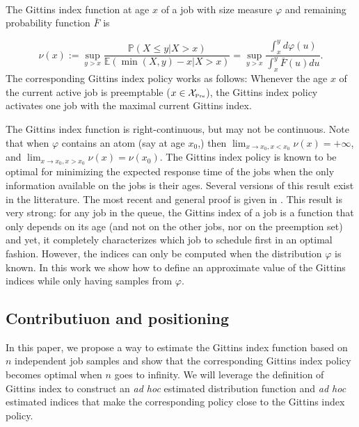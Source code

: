 \documentclass[11pt]{article}
\renewcommand{\phi}{\varphi}
\renewcommand{\leq}{\leqslant}
\newcommand{\E}{\mathbb{E}}
\newcommand{\pr}{\mathbb{P}}
\newcommand{\XP}{\mathcal{X}_{\mbox{\tiny Pre}}}
\begin{document}
\begin{definition}\ \\
   The Gittins index function at age $x$ of a job with  size
   measure $\phi$ and remaining probability function $\bar{F}$ is

    \begin{equation}
      \label{eq:Gittins}
      \nu(x) := \sup_{y > x}\frac{\pr (X \leq y | X>x)}{\E(\min(X,y) -x | X>x)} =  \sup_{y > x} \frac{\int_{x}^{y}  d\phi(u)}{\int_{x}^{y} \bar{F}(u) du}.
    \end{equation}
    The corresponding Gittins index policy works as follows:
    Whenever the  age $x$ of the current active job is preemptable ($x\in \XP$), the Gittins index policy activates one  job with the maximal current Gittins index.
  \end{definition}

  The Gittins index function is right-continuous, but may not be continuous.
Note that when $\phi$ contains an atom (say at age $x_0$,) then   $\lim_{x\to x_0, x< x_0}  \nu(x) = +\infty$, and   $\lim_{x\to x_0, x >  x_0}  \nu(x) = \nu(x_0)$. 
The Gittins index policy is known to be optimal for minimizing the expected response time of the jobs when the only information available on the jobs  is  their ages. Several versions of this result exist in the litterature. The most recent and general proof is given in \cite{Scully2021}. This result  is very strong: for any job in the queue, the Gittins index of a job is a function that only depends on its age (and not on the other jobs, nor on the preemption set) and yet,  it  completely characterizes which job to schedule first in an optimal fashion.  However, the indices can only be computed when the distribution $\phi$ is known.  In this work we show how to define an approximate value of the Gittins indices while only having samples from $\phi$.

\subsection{Contributiuon and positioning}

In this paper, we propose a way to estimate the Gittins index function based on $n$ independent job samples and show that the corresponding Gittins index policy becomes optimal when $n$ goes to infinity.
We will leverage the definition of Gittins index to construct an {\it ad hoc}  estimated distribution function and {\it ad hoc} estimated  indices that make the corresponding policy close to the Gittins index policy.
\end{document}
